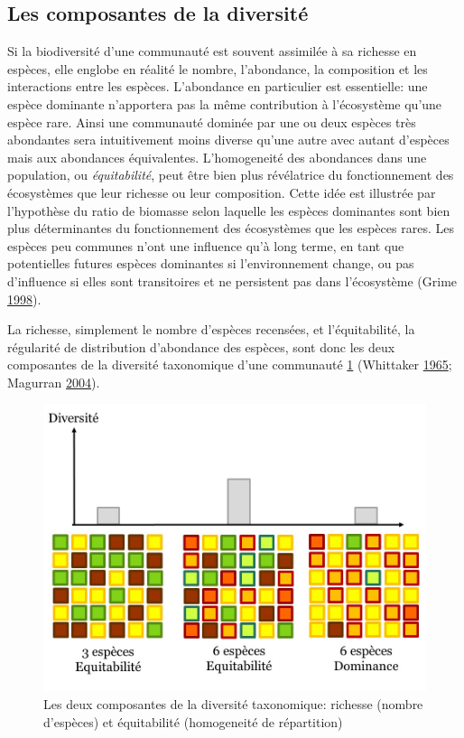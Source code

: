 \documentclass[11pt,french,A4paper,extrafontsizes,onecolumn,openright]{memoir}
\begin{document}
\subsection{Les composantes de la
diversité}\label{les-composantes-de-la-diversite}

Si la biodiversité d'une communauté est souvent assimilée à sa richesse
en espèces, elle englobe en réalité le nombre, l'abondance, la
composition et les interactions entre les espèces. L'abondance en
particulier est essentielle: une espèce dominante n'apportera pas la
même contribution à l'écosystème qu'une espèce rare. Ainsi une
communauté dominée par une ou deux espèces très abondantes sera
intuitivement moins diverse qu'une autre avec autant d'espèces mais aux
abondances équivalentes. L'homogeneité des abondances dans une
population, ou \emph{équitabilité}, peut être bien plus révélatrice du
fonctionnement des écosystèmes que leur richesse ou leur composition.
Cette idée est illustrée par l'hypothèse du ratio de biomasse selon
laquelle les espèces dominantes sont bien plus déterminantes du
fonctionnement des écosystèmes que les espèces rares. Les espèces peu
communes n'ont une influence qu'à long terme, en tant que potentielles
futures espèces dominantes si l'environnement change, ou pas d'influence
si elles sont transitoires et ne persistent pas dans l'écosystème (Grime
\protect\hyperlink{ref-Grime1998}{1998}).

La richesse, simplement le nombre d'espèces recensées, et
l'équitabilité, la régularité de distribution d'abondance des espèces,
sont donc les deux composantes de la diversité taxonomique d'une
communauté \ref{fig:RichEqu} (Whittaker
\protect\hyperlink{ref-Whittaker1965}{1965}; Magurran
\protect\hyperlink{ref-Magurran2004}{2004}).

\begin{figure}

{\centering \includegraphics[width=0.6\linewidth]{ExternalFig/Fig_RichnessEquitability} 

}

\caption{Les deux composantes de la diversité taxonomique: richesse (nombre d'espèces) et équitabilité (homogeneité de répartition)}\label{fig:RichEqu}
\end{figure}
\end{document}
